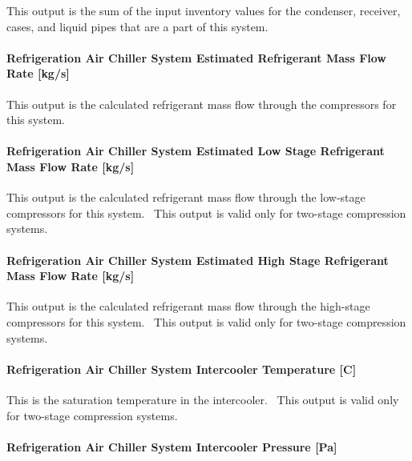 This output is the sum of the input inventory values for the condenser, receiver, cases, and liquid pipes that are a part of this system.

\paragraph{Refrigeration Air Chiller System Estimated Refrigerant Mass Flow Rate {[}kg/s{]}}\label{refrigeration-air-chiller-system-estimated-refrigerant-mass-flow-rate-kgs}

This output is the calculated refrigerant mass flow through the compressors for this system.

\paragraph{Refrigeration Air Chiller System Estimated Low Stage Refrigerant Mass Flow Rate {[}kg/s{]}}\label{refrigeration-air-chiller-system-estimated-low-stage-refrigerant-mass-flow-rate-kgs}

This output is the calculated refrigerant mass flow through the low-stage compressors for this system.~ This output is valid only for two-stage compression systems.

\paragraph{Refrigeration Air Chiller System Estimated High Stage Refrigerant Mass Flow Rate {[}kg/s{]}}\label{refrigeration-air-chiller-system-estimated-high-stage-refrigerant-mass-flow-rate-kgs}

This output is the calculated refrigerant mass flow through the high-stage compressors for this system.~ This output is valid only for two-stage compression systems.

\paragraph{Refrigeration Air Chiller System Intercooler Temperature {[}C{]}}\label{refrigeration-air-chiller-system-intercooler-temperature-c}

This is the saturation temperature in the intercooler.~ This output is valid only for two-stage compression systems.

\paragraph{Refrigeration Air Chiller System Intercooler Pressure {[}Pa{]}}\label{refrigeration-air-chiller-system-intercooler-pressure-pa}

